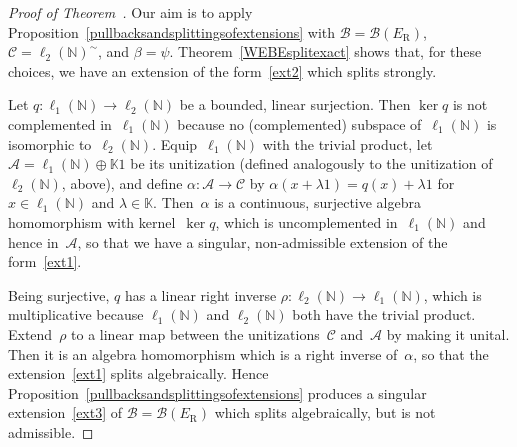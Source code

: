 \documentclass[11pt,reqno]{amsart}
\theoremstyle{definition}
\numberwithin{equation}{section}
\newcommand{\N}{\mathbb{N}}
\newcommand{\K}{\mathbb{K}}
\begin{document}
\begin{proof}[Proof of  Theorem~{\normalfont{\ref{mainthm}}}]
Our aim is to apply
Proposition~\ref{pullbacksandsplittingsofextensions} with $\mathscr{B}
= \mathscr{B}(E_{\text{R}})$, $\mathscr{C} = \ell_2(\N)^{\sim}$, and
$\beta = \psi$. Theorem~\ref{WEBEsplitexact} shows that, for these
choices, we have an extension of the form~\eqref{ext2} which splits
strongly.  

Let $q\colon\ell_1(\N)\to\ell_2(\N)$ be a bounded, linear
surjection. Then $\ker q$ is not complemented in~$\ell_1(\N)$ because
no (complemented) subspace of~$\ell_1(\N)$ is isomorphic
to~$\ell_2(\N)$. Equip~$\ell_1(\N)$ with the trivial product, let
$\mathscr{A} = \ell_1(\N)\oplus\K1$ be its unitization (defined
analogously to the unitization of~$\ell_2(\N)$, above), and define
$\alpha\colon\mathscr{A}\to \mathscr{C}$ by $\alpha(x+\lambda 1) =
q(x)+\lambda 1$ for $x\in\ell_1(\N)$ and $\lambda\in\K$. Then~$\alpha$
is a continuous, surjective algebra homomorphism with kernel~$\ker q$,
which is uncomplemented in~$\ell_1(\N)$ and hence in~$\mathscr{A}$, so
that we have a singular, non-admissible ex\-ten\-sion of the
form~\eqref{ext1}.

Being surjective, $q$ has a linear right inverse
$\rho\colon\ell_2(\N)\to\ell_1(\N)$, which is multiplicative be\-cause
$\ell_1(\N)$ and $\ell_2(\N)$ both have the trivial
product. Extend~$\rho$ to a linear map between the
uni\-ti\-za\-tions~$\mathscr{C}$ and~$\mathscr{A}$ by making it unital. Then
it is an algebra homomorphism which is a right inverse of~$\alpha$, so
that the extension~\eqref{ext1} splits algebraically. Hence
Proposition~\ref{pullbacksandsplittingsofextensions} pro\-duces a
singular extension~\eqref{ext3} of $\mathscr{B} =
\mathscr{B}(E_{\text{R}})$ which splits algebraically, but is not
admissible.
\end{proof}
\end{document}
